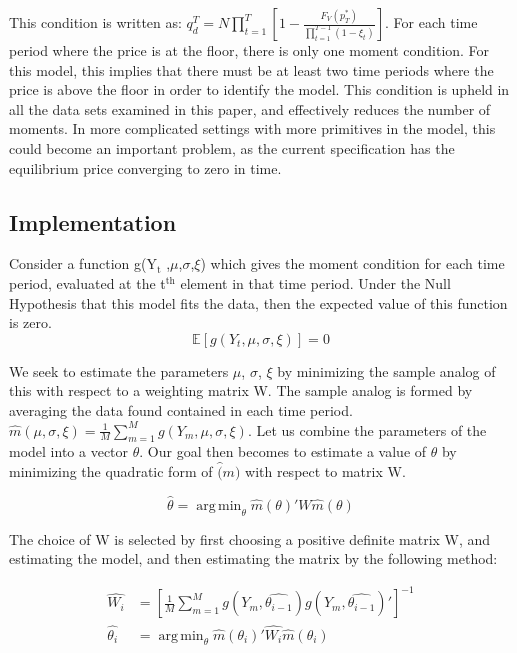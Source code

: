 \documentclass[11pt]{article}
\DeclareMathOperator*{\argmin}{arg\,min}
\begin{document}
This condition is written as: $q_d^T = N \prod_{t=1}^T \left [ 1 - \frac{ F_V (
p_T^* ) }{ \prod_{t=1}^{T-1} ( 1 - \xi_t ) } \right ]$. For each time period where
the price is at the floor, there is only one moment condition. For
this model, this implies that there must be at least two time periods
where the price is above the floor in order to identify the
model. This condition is upheld in all the data sets examined in this
paper, and effectively reduces the number of moments. In more
complicated settings with more primitives in the model, this could
become an important problem, as the current specification has the
equilibrium price converging to zero in time.

\subsection{Implementation}
\label{sec-1-2}
Consider a function g(Y$_{\text{t}}$ ,$\mu$,$\sigma$,$\xi$) which gives the moment condition for
each time period, evaluated at the t$^{\text{th}}$ element in that time
period. Under the Null Hypothesis that this model fits the data, then
the expected value of this function is zero.
\begin{equation*}
\mathbb{E}[ g( Y_t, \mu, \sigma, \xi ) ] = 0
\end{equation*}

We seek to estimate the parameters $\mu$, $\sigma$, $\xi$ by minimizing the sample
analog of this with respect to a weighting matrix W. The sample analog
is formed by averaging the data found contained in each time period.
$\hat{m} ( \mu, \sigma, \xi ) = \frac{ 1 }{ M } \sum_{m=1}^M g( Y_m, \mu, \sigma, \xi )$. Let us
combine the parameters of the model into a vector $\theta$. Our goal then
becomes to estimate a value of $\hat{\theta}$ by minimizing the quadratic
form of $\hat(m)$ with respect to matrix W.

\begin{equation*}
\hat{\theta} = \argmin_{\theta} \hat{m}( \theta )' W \hat{m}( \theta )
\end{equation*}

The choice of W is selected by first choosing a positive definite
matrix W, and estimating the model, and then estimating the matrix by
the following method:

\begin{align*}
\hat{W_i} &= \left [ \frac{1}{M} \sum_{m=1}^M g(Y_m, \hat{\theta_{i-1}} ) g( Y_m, \hat{\theta_{i-1}} )' \right ]^{-1} \\
\hat{\theta_i} &= \argmin_{\theta} \hat{m}( \theta_i )' \hat{W_i} \hat{m}( \theta_i ) \\
\end{align*}
\end{document}
